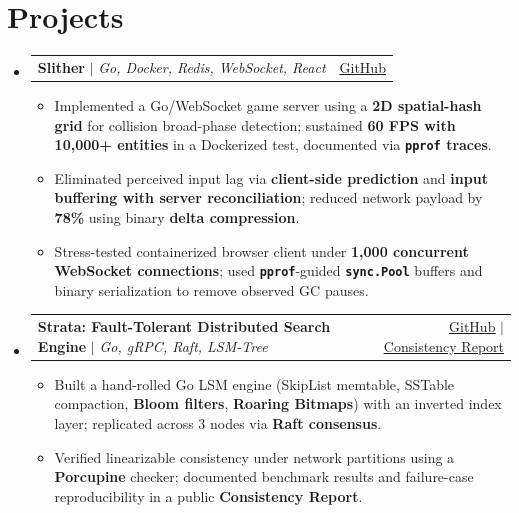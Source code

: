 \documentclass[letterpaper,11pt]{article}
\makeatletter
\newcommand{\resumeItem}[1]{
  \item\small{
    {#1 \vspace{-2pt}}
  }
}
\newcommand{\resumeProjectHeading}[2]{
    \vspace{-2.5pt}\item
    \begin{tabular*}{0.97\textwidth}{l@{\extracolsep{\fill}}r}
      \small#1 & #2 \\
    \end{tabular*}\vspace{-5.5pt}
}
\newcommand{\resumeSubHeadingListStart}{\begin{itemize}[leftmargin=0.15in, label={}, itemsep=0pt]}
\newcommand{\resumeSubHeadingListEnd}{\end{itemize}\vspace{-8.5pt}}
\newcommand{\resumeItemListStart}{\begin{itemize}[noitemsep, topsep=0pt]}
\newcommand{\resumeItemListEnd}{\end{itemize}\vspace{-4.0pt}}
\makeatother
\begin{document}
\section[Projects]{Projects \hfill \normalfont\footnotesize{}}
    \resumeSubHeadingListStart
      \resumeProjectHeading
          {\textbf{Slither} $|$ \emph{Go, Docker, Redis, WebSocket, React}}{{\href{https://github.com/kyyril/slither}{\underline{GitHub}}}}
          \resumeItemListStart
            \resumeItem{Implemented a Go/WebSocket game server using a \textbf{2D spatial-hash grid} for collision broad-phase detection; sustained \textbf{60 FPS with 10,000+ entities} in a Dockerized test, documented via \textbf{\texttt{pprof} traces}.}
            \resumeItem{Eliminated perceived input lag via \textbf{client-side prediction} and \textbf{input buffering with server reconciliation}; reduced network payload by \textbf{78\%} using binary \textbf{delta compression}.}
            \resumeItem{Stress-tested containerized browser client under \textbf{1,000 concurrent WebSocket connections}; used \textbf{\texttt{pprof}}-guided \textbf{\texttt{sync.Pool}} buffers and binary serialization to remove observed GC pauses.}
          \resumeItemListEnd

      \resumeProjectHeading
          {\textbf{Strata: Fault-Tolerant Distributed Search Engine} $|$ \emph{Go, gRPC, Raft, LSM-Tree}}{{\href{https://github.com/kyyril/raft-indexer}{\underline{GitHub}}} $|$ {\href{https://github.com/kyyril/raft-indexer\#consistency}{\underline{Consistency Report}}}}
          \resumeItemListStart
            \resumeItem{Built a hand-rolled Go LSM engine (SkipList memtable, SSTable compaction, \textbf{Bloom filters}, \textbf{Roaring Bitmaps}) with an inverted index layer; replicated across 3 nodes via \textbf{Raft consensus}.}
            \resumeItem{Verified linearizable consistency under network partitions using a \textbf{Porcupine} checker; documented benchmark results and failure-case reproducibility in a public \textbf{Consistency Report}.}
          \resumeItemListEnd
    \resumeSubHeadingListEnd

\end{document}
